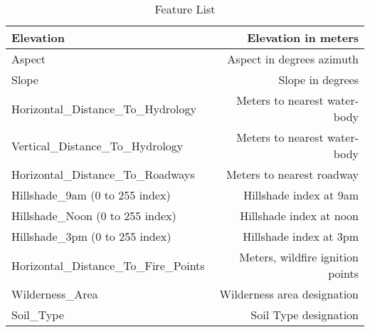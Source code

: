 \begin{table}
  \begin{tabular}{ l | r }
    \hline
    Elevation & Elevation in meters \\
    \hline
    Aspect & Aspect in degrees azimuth \\
    \hline
    Slope & Slope in degrees \\
    \hline
    Horizontal\_Distance\_To\_Hydrology & Meters to nearest water-body \\
    \hline
    Vertical\_Distance\_To\_Hydrology & Meters to nearest water-body \\
    \hline
    Horizontal\_Distance\_To\_Roadways & Meters to nearest roadway \\
    \hline
    Hillshade\_9am (0 to 255 index) & Hillshade index at 9am \\
    \hline
    Hillshade\_Noon (0 to 255 index) & Hillshade index at noon \\
    \hline
    Hillshade\_3pm (0 to 255 index) & Hillshade index at 3pm \\
    \hline
    Horizontal\_Distance\_To\_Fire\_Points & Meters, wildfire ignition points \\
    \hline
    Wilderness\_Area & Wilderness area designation \\
    \hline
    Soil\_Type & Soil Type designation \\
    \hline
  \end{tabular}
  \caption{Feature List}
  \label{table:featurelist}
\end{table}



